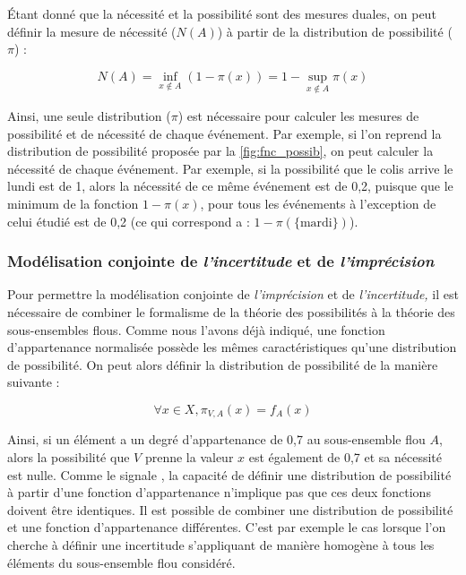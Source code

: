 Étant donné que la nécessité et la possibilité sont des mesures
duales, on peut définir la mesure de nécessité (\(N(A)\)) à partir de
la distribution de possibilité (\(π\)) :

\begin{equation}
  N(A) = \inf_{x ∉ A}(1-π(x)) = 1 - \sup_{x ∉ A}π(x)
\end{equation}

Ainsi, une seule distribution (\(\pi\)) est nécessaire pour calculer
les mesures de possibilité et de nécessité de chaque événement. Par
exemple, si l'on reprend la distribution de possibilité proposée par
la \autoref{fig:fnc_possib}, on peut calculer la nécessité de chaque
événement. Par exemple, si la possibilité que le colis arrive le lundi
est de 1, alors la nécessité de ce même événement est de 0,2, puisque
que le minimum de la fonction \(1-π(x)\), pour tous les événements à
l'exception de celui étudié est de 0,2 (ce qui correspond a :
\(1-π(\{\text{mardi}\})\)).

\subsubsection{Modélisation conjointe de \emph{l'incertitude} et de
  \emph{l'imprécision}}

Pour permettre la modélisation conjointe de \emph{l'imprécision} et de
\emph{l'incertitude,} il est nécessaire de combiner le formalisme de
la théorie des possibilités à la théorie des sous-ensembles
flous. Comme nous l'avons déjà indiqué, une fonction d'appartenance
normalisée possède les mêmes caractéristiques qu'une distribution de
possibilité. On peut alors définir la distribution de possibilité de
la manière suivante :

\begin{equation}
  \forall x \in X, \pi_{V, A}(x)=f_A(x)
\end{equation}

Ainsi, si un élément a un degré d'appartenance de 0,7 au sous-ensemble
flou \(A\), alors la possibilité que \(V\) prenne la valeur \(x\) est
également de 0,7 et sa nécessité est nulle.
%
Comme le signale \textcite{Bouchon-Meunier1995}, la capacité de
définir une distribution de possibilité à partir d'une fonction
d'appartenance n'implique pas que ces deux fonctions doivent être
identiques. Il est possible de combiner une distribution de
possibilité et une fonction d'appartenance différentes.
%
C'est par exemple le cas lorsque l'on cherche à définir une
incertitude s'appliquant de manière homogène à tous les éléments du
sous-ensemble flou considéré.


